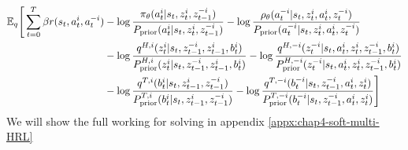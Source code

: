 \begin{equation}
\begin{aligned}
    \mathbb{E}_q\Bigg[\sum^T_{t=0}\beta r(s_t, a_t^i, a^{-i}_t) &- \log\frac{\pi_\theta(a^i_t | s_t, z^i_t, z^{-i}_{t-1})}{P_{\text{prior}}(a^i_t | s_t, z^i_t, z^{-i}_{t-1})} - \log\frac{\rho_\theta(a^{-i}_t | s_t, z^i_t, a^i_t, z^{-i}_t) }{P_{\text{prior}}(a^{-i}_t | s_t, z^i_t, a^i_t, z^{-i}_t)} \\
    &- \log\frac{q^{H, i}(z^i_t | s_t, z^{-i}_{t-1}, z^i_{t-1}, b^i_t)}{P^{H, i}_{\text{prior}}(z^i_t | s_t, z^{-i}_{t-1}, z^i_{t-1}, b^i_t)} - \log\frac{q^{H, -i}(z^{-i}_t | s_t, a^i_t, z^i_t, z^{-i}_{t-1}, b^i_t)}{P^{H, -i}_{\text{prior}}(z^{-i}_t | s_t, a^i_t, z^i_t, z^{-i}_{t-1}, b^i_t)} \\
    &- \log\frac{q^{T,i}(b^i_t | s_t, z^i_{t-1}, z^{-i}_{t-1})}{P^{T,i}_{\text{prior}}(b^i_t | s_t, z^i_{t-1}, z^{-i}_{t-1})} - \log\frac{q^{T,-i}(b^{-i}_t | s_t,  z^{-i}_{t-1}, a^i_t, z^i_t)}{P^{T,-i}_{\text{prior}}(b^{-i}_t | s_t,  z^{-i}_{t-1}, a^i_t, z^i_t) } \Bigg]
\end{aligned}
\end{equation}
We will show the full working for solving in appendix \ref{appx:chap4-soft-multi-HRL}
